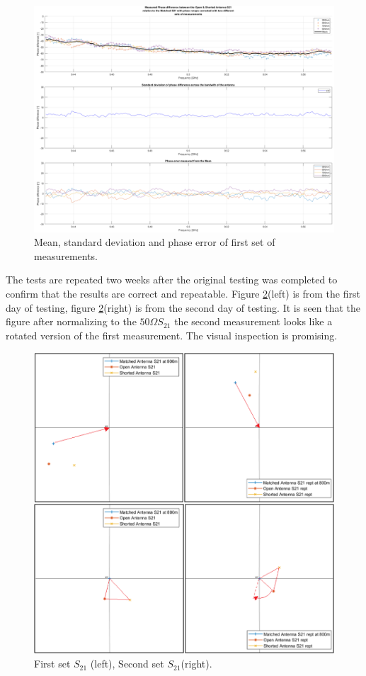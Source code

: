     \begin{figure}[H]
    \centering
    \includegraphics[width=0.99\linewidth]{Figures/chp4_Calibrated_difference_results.png}
    \caption{Mean, standard deviation and phase error of first set of measurements.}
    \label{fig:chp4_Calibrated_difference_results}
    \end{figure}

The tests are repeated two weeks after the original testing was completed to confirm that the results are correct and repeatable. Figure \ref{fig:chp4_Calibrated_smith_rept}(left) is from the first day of testing, figure \ref{fig:chp4_Calibrated_smith_rept}(right) is from the second day of testing. It is seen that the figure after normalizing to the \(50\Omega S_{21}\) the second measurement looks like a rotated version of the first measurement. The visual inspection is promising. 

    \begin{figure}[H]
    \centering
    \includegraphics[width=0.9\linewidth]{Figures/chp4_Calibrated_smith_rept.png}
    \caption{First set \(S_{21}\) (left), Second set \(S_{21}\)(right).}
    \label{fig:chp4_Calibrated_smith_rept}
    \end{figure}

